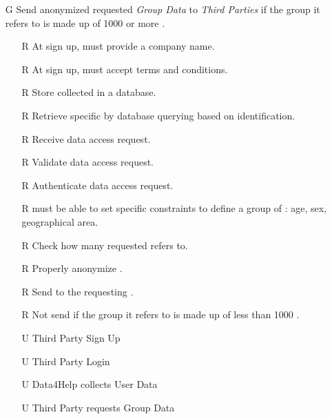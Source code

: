 \documentclass[../../../rasd.tex]{subfiles}
\begin{document}
\begin{itemize}
    \item[G\subs{3}]Send anonymized requested \textit{Group Data} to \textit{Third Parties} if the group it refers to is made up of 1000 or more .
    \begin{itemize}
            \item[R\subs{3}]At sign up,  must provide a company name.
            \item[R\subs{5}]At sign up,  must accept terms and conditions.
        \item[R\subs{11}]Store collected  in a database.
        \item[R\subs{12}]Retrieve specific  by database querying based on  identification.
        \item[R\subs{13}]Receive  data access request.
        \item[R\subs{14}]Validate  data access request.
        \item[R\subs{15}]Authenticate  data access request.
        \item[R\subs{21}] must be able to set specific constraints to define a group of : age, sex, geographical area.
        \item[R\subs{22}]Check how many  requested  refers to.
        \item[R\subs{23}]Properly anonymize .
        \item[R\subs{24}]Send  to the requesting .
        \item[R\subs{25}]Not send  if the group it refers to is made up of less than 1000 .
        \\
        \item[U\subs{2}]Third Party Sign Up
        \item[U\subs{4}]Third Party Login
        \item[U\subs{5}]Data4Help collects User Data
        \item[U\subs{7}]Third Party requests Group Data
    \end{itemize}


\end{itemize}
\end{document}
